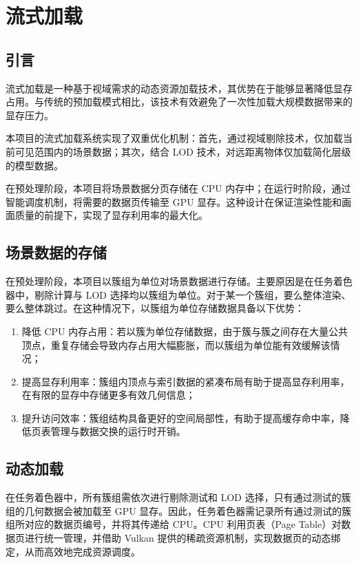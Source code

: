 \section{流式加载} \label{sec:streaming}

\subsection{引言}

流式加载是一种基于视域需求的动态资源加载技术，其优势在于能够显著降低显存占用。与传统的预加载模式相比，该技术有效避免了一次性加载大规模数据带来的显存压力\cite{sahm2004}。

本项目的流式加载系统实现了双重优化机制：首先，通过视域剔除技术，仅加载当前可见范围内的场景数据\cite{CohenOr2003}；其次，结合 LOD 技术，对远距离物体仅加载简化层级的模型数据。

在预处理阶段，本项目将场景数据分页存储在 CPU 内存中；在运行时阶段，通过智能调度机制，将需要的数据页传输至 GPU 显存。这种设计在保证渲染性能和画面质量的前提下，实现了显存利用率的最大化。

\subsection{场景数据的存储}

在预处理阶段，本项目以簇组为单位对场景数据进行存储。主要原因是在任务着色器中，剔除计算与 LOD 选择均以簇组为单位。对于某一个簇组，要么整体渲染、要么整体跳过。在这种情况下，以簇组为单位存储数据具备以下优势：

\begin{enumerate}
    \item 降低 CPU 内存占用：若以簇为单位存储数据，由于簇与簇之间存在大量公共顶点，重复存储会导致内存占用大幅膨胀，而以簇组为单位能有效缓解该情况；
    \item 提高显存利用率：簇组内顶点与索引数据的紧凑布局有助于提高显存利用率，在有限的显存中存储更多有效几何信息；
    \item 提升访问效率：簇组结构具备更好的空间局部性\cite{MCCOOL2012}，有助于提高缓存命中率，降低页表管理与数据交换的运行时开销。
\end{enumerate}

\subsection{动态加载}

在任务着色器中，所有簇组需依次进行剔除测试和 LOD 选择，只有通过测试的簇组的几何数据会被加载至 GPU 显存。因此，任务着色器需记录所有通过测试的簇组所对应的数据页编号，并将其传递给 CPU。CPU 利用页表（Page Table）对数据页进行统一管理，并借助 Vulkan 提供的稀疏资源机制，实现数据页的动态绑定，从而高效地完成资源调度。

